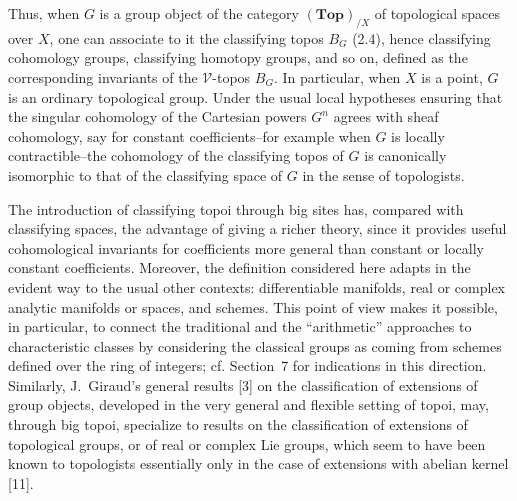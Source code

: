 \documentclass[11pt]{article}
\newcommand{\V}{\mathcal{V}}
\newcommand{\Esp}{\mathbf{Top}}
\begin{document}
Thus, when \(G\) is a group object of the category \((\Esp)_{/X}\) of topological spaces over \(X\), one can associate to it the classifying topos \(B_G\) (2.4), hence classifying cohomology groups, classifying homotopy groups, and so on, defined as the corresponding invariants of the \(\V\)-topos \(B_G\). In particular, when \(X\) is a point, \(G\) is an ordinary topological group. Under the usual local hypotheses ensuring that the singular cohomology of the Cartesian powers \(G^n\) agrees with sheaf cohomology, say for constant coefficients--for example when \(G\) is locally contractible--the cohomology of the classifying topos of \(G\) is canonically isomorphic to that of the classifying space of \(G\) in the sense of topologists.

The introduction of classifying topoi through big sites has, compared with classifying spaces, the advantage of giving a richer theory, since it provides useful cohomological invariants for coefficients more general than constant or locally constant coefficients. Moreover, the definition considered here adapts in the evident way to the usual other contexts: differentiable manifolds, real or complex analytic manifolds or spaces, and schemes. This point of view makes it possible, in particular, to connect the traditional and the ``arithmetic'' approaches to characteristic classes by considering the classical groups as coming from schemes defined over the ring of integers; cf. Section~7 for indications in this direction. Similarly, J.~Giraud's general results [3] on the classification of extensions of group objects, developed in the very general and flexible setting of topoi, may, through big topoi, specialize to results on the classification of extensions of topological groups, or of real or complex Lie groups, which seem to have been known to topologists essentially only in the case of extensions with abelian kernel [11].
\end{document}
